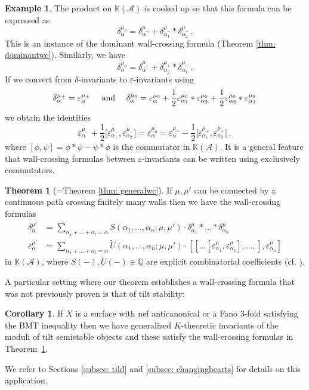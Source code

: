 \documentclass[12pt]{amsart}
\theoremstyle{definition}
\newtheorem{example}[definition]{Example}
\newtheorem{corollary}[definition]{Corollary}
\newtheorem{thm}{Theorem}
\newcommand{\BK}{{\mathbb{K}}}
\newcommand{\BQ}{{\mathbb{Q}}}
\newcommand{\CA}{{\mathcal A}}
\newcommand{\1}{\mathbf 1}
\begin{document}
\begin{example}
The product on $\BK(\CA)$ is cooked up so that this formula can be expressed as
\[\delta_{\alpha}^{\mu_0}=\delta_{\alpha}^{\mu_-}+\delta_{\alpha_1}^{\mu_-}\ast \delta_{\alpha_2}^{\mu_-}\,.\]
This is an instance of the dominant wall-crossing formula (Theorem \ref{thm: dominantwc}). Similarly, we have 
\[\delta_{\alpha}^{\mu_0}=\delta_{\alpha}^{\mu_+}+\delta_{\alpha_2}^{\mu_+}\ast \delta_{\alpha_1}^{\mu_+}\,.\]
If we convert from $\delta$-invariants to $\varepsilon$-invariants using
\[\delta_\alpha^{\mu_\pm}=\varepsilon_\alpha^{\mu_\pm} \quad \textup{ and }\quad \delta_\alpha^{\mu_0}=\varepsilon_\alpha^{\mu_0}+\frac{1}{2}\varepsilon_{\alpha_1}^{\mu_0}\ast \varepsilon_{\alpha_2}^{\mu_0}+ \frac{1}{2}\varepsilon_{\alpha_2}^{\mu_0}\ast \varepsilon_{\alpha_1}^{\mu_0}\]
we obtain the identities
\[\varepsilon_{\alpha}^{\mu_-}+\frac{1}{2}\big[\varepsilon_{\alpha_1}^{\mu_-}, \varepsilon_{\alpha_2}^{\mu_-}\big]=\varepsilon^{\mu_0}_{\alpha}=\varepsilon_{\alpha}^{\mu_+}-\frac{1}{2}\big[\varepsilon_{\alpha_1}^{\mu_+}, \varepsilon_{\alpha_2}^{\mu_+}\big]\,,\]
where $[\phi,\psi]=\phi\ast\psi-\psi\ast \phi$ is the commutator in $\BK(\CA)$. It is a general feature that wall-crossing formulas between $\varepsilon$-invariants can be written using exclusively commutators.
\end{example}

\begin{thm}[=Theorem \ref{thm: generalwc}]\label{thm: B}
   If $\mu, \mu'$ can be connected by a continuous path crossing finitely many walls then we have the wall-crossing formulas
    \begin{align*}\delta_{\alpha}^{\mu'}&=\sum_{\alpha_1+\ldots+\alpha_l=\alpha}S(\alpha_1, \ldots, \alpha_n; \mu, \mu')\cdot \delta_{\alpha_1}^{\mu}\ast \ldots\ast \delta_{\alpha_n}^{\mu}\\
    \varepsilon_{\alpha}^{\mu'}
    &\nonumber=\sum_{\alpha_1+\ldots+\alpha_l=\alpha}\tilde U(\alpha_1, \ldots, \alpha_n; \mu, \mu')\cdot [[\ldots [\varepsilon_{\alpha_1}^{\mu}, \varepsilon_{\alpha_2}^\mu], \ldots, ],\varepsilon_{\alpha_n}^{\mu}]
    \end{align*}
    in $\BK(\CA)$, where $S(-), \tilde U(-)\in \BQ$ are explicit combinatorial coefficients (cf. \cite[Section 4]{JO06IV}).
\end{thm}


A particular setting where our theorem establishes a wall-crossing formula that was not previously proven is that of tilt stability:

\begin{corollary}
    If $X$ is a surface with nef anticanonical or a Fano 3-fold satisfying the BMT inequality then we have generalized $K$-theoretic invariants of the moduli of tilt semistable objects and these satisfy the wall-crossing formulas in Theorem~\ref{thm: B}.
\end{corollary}
We refer to Sections \ref{subsec: tild} and \ref{subsec: changinghearts} for details on this application.
\end{document}
